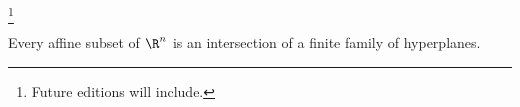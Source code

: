 
  \ifhmode\unskip\fi\footnote{
Future editions will include.
  }

\begin{proposition}
Every affine subset of $\R ^n$ is an intersection of a finite family of hyperplanes.
\end{proposition}

\blankpage
